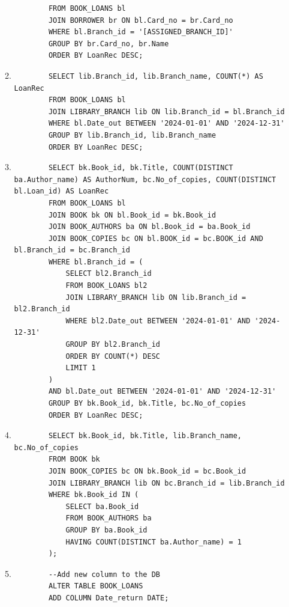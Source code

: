\documentclass[12pt,a4paper]{article}
\begin{document}
\begin{enumerate}
\begin{enumerate}
\begin{verbatim}
        FROM BOOK_LOANS bl
        JOIN BORROWER br ON bl.Card_no = br.Card_no
        WHERE bl.Branch_id = '[ASSIGNED_BRANCH_ID]'
        GROUP BY br.Card_no, br.Name
        ORDER BY LoanRec DESC;
        \end{verbatim}
        \item
        \begin{verbatim}
        SELECT lib.Branch_id, lib.Branch_name, COUNT(*) AS LoanRec
        FROM BOOK_LOANS bl
        JOIN LIBRARY_BRANCH lib ON lib.Branch_id = bl.Branch_id
        WHERE bl.Date_out BETWEEN '2024-01-01' AND '2024-12-31'
        GROUP BY lib.Branch_id, lib.Branch_name
        ORDER BY LoanRec DESC;
        \end{verbatim}
        \item
        \begin{verbatim}
        SELECT bk.Book_id, bk.Title, COUNT(DISTINCT ba.Author_name) AS AuthorNum, bc.No_of_copies, COUNT(DISTINCT bl.Loan_id) AS LoanRec
        FROM BOOK_LOANS bl
        JOIN BOOK bk ON bl.Book_id = bk.Book_id
        JOIN BOOK_AUTHORS ba ON bl.Book_id = ba.Book_id
        JOIN BOOK_COPIES bc ON bl.BOOK_id = bc.BOOK_id AND bl.Branch_id = bc.Branch_id
        WHERE bl.Branch_id = (
            SELECT bl2.Branch_id
            FROM BOOK_LOANS bl2
            JOIN LIBRARY_BRANCH lib ON lib.Branch_id = bl2.Branch_id
            WHERE bl2.Date_out BETWEEN '2024-01-01' AND '2024-12-31'
            GROUP BY bl2.Branch_id
            ORDER BY COUNT(*) DESC
            LIMIT 1
        )
        AND bl.Date_out BETWEEN '2024-01-01' AND '2024-12-31'
        GROUP BY bk.Book_id, bk.Title, bc.No_of_copies
        ORDER BY LoanRec DESC;
        \end{verbatim}

        \item
        \begin{verbatim}
        SELECT bk.Book_id, bk.Title, lib.Branch_name, bc.No_of_copies
        FROM BOOK bk
        JOIN BOOK_COPIES bc ON bk.Book_id = bc.Book_id
        JOIN LIBRARY_BRANCH lib ON bc.Branch_id = lib.Branch_id
        WHERE bk.Book_id IN (
            SELECT ba.Book_id
            FROM BOOK_AUTHORS ba
            GROUP BY ba.Book_id
            HAVING COUNT(DISTINCT ba.Author_name) = 1
        );
        \end{verbatim}
        \item
        \begin{verbatim}
        --Add new column to the DB
        ALTER TABLE BOOK_LOANS
        ADD COLUMN Date_return DATE;


\end{verbatim}
\end{enumerate}
\end{enumerate}
\end{document}
